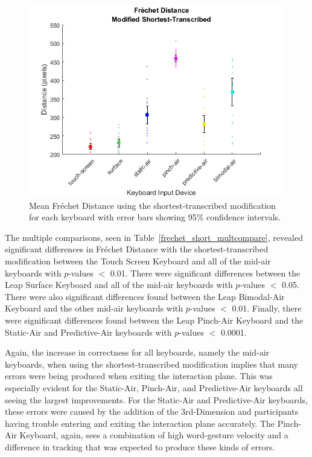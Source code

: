 \begin{figure}[h]
	\centering
	\includegraphics{fig_frechet_short_mean}
	\caption[Mean Fr\'echet Distance for Modified-Shortest]{Mean Fr\'echet Distance using the shortest-transcribed modification for each keyboard with error bars showing 95\% confidence intervals.}
	\label{fig_frechet_short_mean}
\end{figure}

The multiple comparisons, seen in Table~\ref{frechet_short_multcompare}, revealed significant differences in Fr\'echet Distance with the shortest-transcribed modification between the Touch Screen Keyboard and all of the mid-air keyboards with $p$-values $<$ 0.01. There were significant differences between the Leap Surface Keyboard and all of the mid-air keyboards with $p$-values $<$ 0.05. There were also significant differences found between the Leap Bimodal-Air Keyboard and the other mid-air keyboards with $p$-values $<$ 0.01. Finally, there were significant differences found between the Leap Pinch-Air Keyboard and the Static-Air and Predictive-Air keyboards with $p$-values $<$ 0.0001.

Again, the increase in correctness for all keyboards, namely the mid-air keyboards, when using the shortest-transcribed modification implies that many errors were being produced when exiting the interaction plane. This was especially evident for the Static-Air, Pinch-Air, and Predictive-Air keyboards all seeing the largest improvements. For the Static-Air and Predictive-Air keyboards, these errors were caused by the addition of the 3rd-Dimension and participants having trouble entering and exiting the interaction plane accurately. The Pinch-Air Keyboard, again, sees a combination of high word-gesture velocity and a difference in tracking that was expected to produce these kinds of errors.

